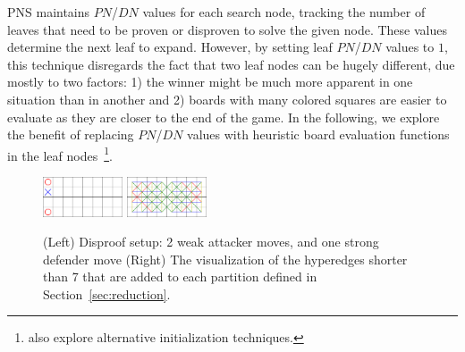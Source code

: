 \documentclass[conference]{IEEEtran}
\theoremstyle{definition}
\newcommand{\pn}{$PN$\xspace}
\newcommand{\dn}{$DN$\xspace}
\begin{document}
PNS maintains \pn/\dn values for each search node, tracking the number of leaves that need to be proven or disproven to solve the given node. These values determine the next leaf to expand.
However, by setting leaf \pn/\dn values to $1$, this technique disregards the fact that two leaf nodes can be hugely different, due mostly to two factors: 1) the winner might be much more apparent in one situation than in another and 2) boards with many colored squares are easier to evaluate as they are closer to the end of the game. In the following, we explore the benefit of replacing \pn/\dn values with heuristic board evaluation functions in the leaf nodes~\footnote{\cite{Allis1994SearchingFS,mcts_saito,PNS_variants} also explore alternative initialization techniques.}.

%


\begin{figure}%
    \centering
    {{
    \includegraphics[width = 0.21\textwidth]{papers/cog2021/figures/disproof_setup.png}
    }}
    \qquad
    {{
        \includegraphics[width=0.21\textwidth]{papers/cog2021/figures/lines.png}
    }}
    \caption{(Left) Disproof setup: 2 weak attacker moves, and one strong defender move (Right) The visualization of the hyperedges shorter than 7 that are added to each partition defined in Section~\ref{sec:reduction}.}%
    \label{fig:disproof_setup_and_lines}%
    \vspace{-10pt}
\end{figure}
\end{document}
